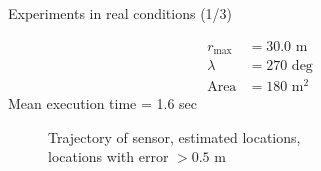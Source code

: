\begin{frame}[noframenumbering]{Experiments in real conditions (1/3)}

\begin{minipage}{0.4\textwidth}
  \begin{align}
    r_{\max} &= 30.0 \text{ m} \nonumber \\
    \lambda &= 270 \text{ deg} \nonumber \\
    \text{Area} &= 180 \text{ m}^2 \nonumber
  \end{align}
  Mean execution time = 1.6 sec
\end{minipage}%
\begin{minipage}{.6\textwidth}
  \begin{figure}
    
    \caption{\footnotesize \textcolor{exp1_blue}{Trajectory of sensor},
                           \textcolor{exp1_green}{estimated locations},\\
                           \textcolor{exp1_red}{locations with error $ > 0.5$ m}}
  \end{figure}
\end{minipage}

\end{frame}
